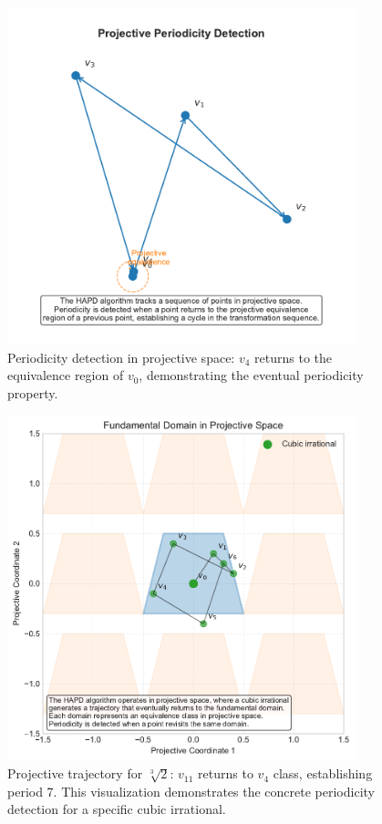\begin{figure}[htbp]
\centering
\includegraphics[width=0.9\textwidth]{figures/output/projective_periodicity_visualization.pdf}
\caption{Periodicity detection in projective space: $v_4$ returns to the equivalence region of $v_0$, demonstrating the eventual periodicity property.}
\label{fig:projective_visualization}
\end{figure}

\begin{figure}[htbp]
\centering
\includegraphics[width=0.9\textwidth]{figures/projective_space_regions.pdf}
\caption{Projective trajectory for $\sqrt[3]{2}$: $v_{11}$ returns to $v_4$ class, establishing period 7. This visualization demonstrates the concrete periodicity detection for a specific cubic irrational.}
\label{fig:projective_trajectory}
\end{figure}

